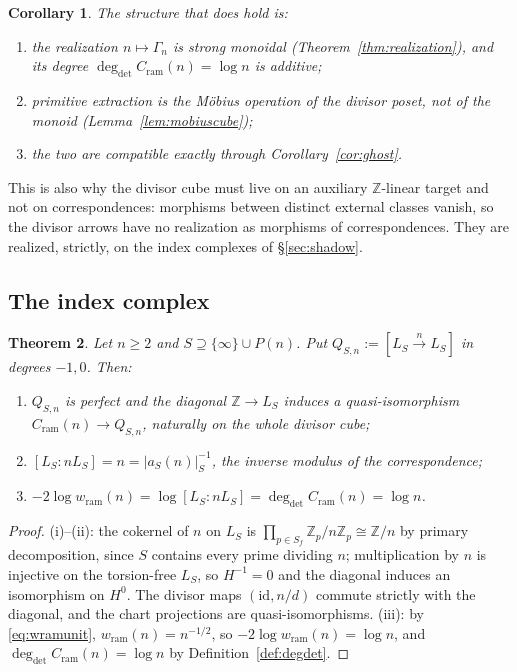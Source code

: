 \documentclass[11pt]{amsart}
\newtheorem{theorem}{Theorem}[section]
\newtheorem{corollary}[theorem]{Corollary}
\theoremstyle{definition}
\theoremstyle{remark}
\newcommand{\Z}{\mathbb Z}
\newcommand{\degdet}{\operatorname{deg}_{\mathrm{det}}}
\begin{document}
\begin{corollary}\label{cor:structurethatholds}
The structure that does hold is:
\begin{enumerate}
\item[(i)] the realization $n\mapsto\Gamma_n$ \emph{is} strong monoidal
(Theorem~\ref{thm:realization}), and its degree
$\degdet C_{\mathrm{ram}}(n)=\log n$ \emph{is} additive;
\item[(ii)] primitive extraction is the M\"obius operation of the divisor
\emph{poset}, not of the monoid (Lemma~\ref{lem:mobiuscube});
\item[(iii)] the two are compatible exactly through Corollary~\ref{cor:ghost}.
\end{enumerate}
\end{corollary}

This is also why the divisor cube must live on an auxiliary $\Z$-linear target
and not on correspondences: morphisms between distinct external classes vanish,
so the divisor arrows have no realization as morphisms of correspondences. They
are realized, strictly, on the index complexes of \S\ref{sec:shadow}.

\subsection{The index complex}

\begin{theorem}\label{thm:indexcomplex}
Let $n\ge2$ and $S\supseteq\{\infty\}\cup P(n)$. Put
$Q_{S,n}:=[L_S\xrightarrow{n}L_S]$ in degrees $-1,0$. Then:
\begin{enumerate}
\item[(i)] $Q_{S,n}$ is perfect and the diagonal $\Z\to L_S$ induces a
quasi-isomorphism $C_{\mathrm{ram}}(n)\to Q_{S,n}$, naturally on the whole
divisor cube;
\item[(ii)] $[L_S:nL_S]=n=|a_S(n)|_S^{-1}$, the inverse modulus of the
correspondence;
\item[(iii)] $-2\log w_{\mathrm{ram}}(n)=\log[L_S:nL_S]
=\degdet C_{\mathrm{ram}}(n)=\log n$.
\end{enumerate}
\end{theorem}

\begin{proof}
(i)--(ii): the cokernel of $n$ on $L_S$ is
$\prod_{p\in S_f}\Z_p/n\Z_p\cong\Z/n$ by primary decomposition, since $S$
contains every prime dividing $n$; multiplication by $n$ is injective on the
torsion-free $L_S$, so $H^{-1}=0$ and the diagonal induces an isomorphism on
$H^0$. The divisor maps $(\mathrm{id},n/d)$ commute strictly with the diagonal,
and the chart projections are quasi-isomorphisms. (iii): by
\eqref{eq:wramunit}, $w_{\mathrm{ram}}(n)=n^{-1/2}$, so
$-2\log w_{\mathrm{ram}}(n)=\log n$, and
$\degdet C_{\mathrm{ram}}(n)=\log n$ by Definition~\ref{def:degdet}.
\end{proof}
\end{document}
